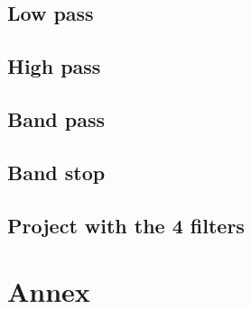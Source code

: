 \documentclass[12pt]{article}   	%
\begin{document}
\subsection{Low pass}



\subsection{High pass}



\subsection{Band pass}



\subsection{Band stop}



\subsection{Project with the 4 filters}


\printbibliography


\section*{Annex}












\end{document}
